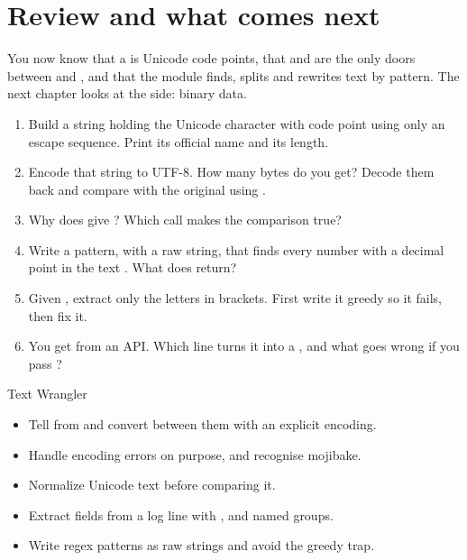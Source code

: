 \section{Review and what comes next}

You now know that a  is Unicode code points, that  and
 are the only doors between  and , and that the 
module finds, splits and rewrites text by pattern. The next chapter looks at the 
side: binary data.

\begin{practice}
\begin{enumerate}[nosep,leftmargin=*]
  \item Build a string holding the Unicode character with code point  using only
        an escape sequence. Print its official name and its length.
  \item Encode that string to UTF-8. How many bytes do you get? Decode them back and compare
        with the original using \code{==}.
  \item Why does  give ? Which
        call makes the comparison true?
  \item Write a pattern, with a raw string, that finds every number with a decimal point in the
        text . What does  return?
  \item Given , extract only the letters in brackets. First write it greedy so
        it fails, then fix it.
  \item You get  from an API. Which line turns it
        into a , and what goes wrong if you pass ?
\end{enumerate}
\end{practice}

\begin{achievement}{Text Wrangler}
\begin{itemize}[nosep,leftmargin=*]
  \item Tell  from  and convert between them with an explicit encoding.
  \item Handle encoding errors on purpose, and recognise mojibake.
  \item Normalize Unicode text before comparing it.
  \item Extract fields from a log line with ,  and named groups.
  \item Write regex patterns as raw strings and avoid the greedy trap.
\end{itemize}
\end{achievement}
